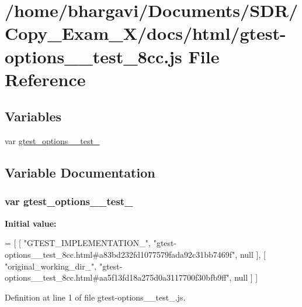 \hypertarget{gtest-options____test__8cc_8js}{}\section{/home/bhargavi/\+Documents/\+S\+D\+R/\+Copy\+\_\+\+Exam\+\_\+X/docs/html/gtest-\/options\+\_\+\+\_\+test\+\_\+8cc.js File Reference}
\label{gtest-options____test__8cc_8js}
\subsection*{Variables}
\begin{DoxyCompactItemize}
\item 
var \hyperlink{gtest-options____test__8cc_8js_a016bf86e13247ab8c07812a7db77d10c}{gtest\+\_\+options\+\_\+\+\_\+test\+\_}
\end{DoxyCompactItemize}


\subsection{Variable Documentation}
\subsubsection[{\texorpdfstring{gtest\+\_\+options\+\_\+\+\_\+test\+\_\+8cc}{gtest_options__test_8cc}}]{\setlength{\rightskip}{0pt plus 5cm}var gtest\+\_\+options\+\_\+\+\_\+test\+\_}\hypertarget{gtest-options____test__8cc_8js_a016bf86e13247ab8c07812a7db77d10c}{}\label{gtest-options____test__8cc_8js_a016bf86e13247ab8c07812a7db77d10c}
{\bfseries Initial value\+:}
\begin{DoxyCode}
=
[
    [ \textcolor{stringliteral}{"GTEST\_IMPLEMENTATION\_"}, \textcolor{stringliteral}{"gtest-options\_\_test\_8cc.html#a83bd232fd1077579fada92c31bb7469f"}, null ],
    [ \textcolor{stringliteral}{"original\_working\_dir\_"}, \textcolor{stringliteral}{"gtest-options\_\_test\_8cc.html#aa5f13fd18a275d0a3117700f30bfb9ff"}, null ]
]
\end{DoxyCode}


Definition at line 1 of file gtest-\/options\+\_\+\+\_\+test\+\_.\+js.

